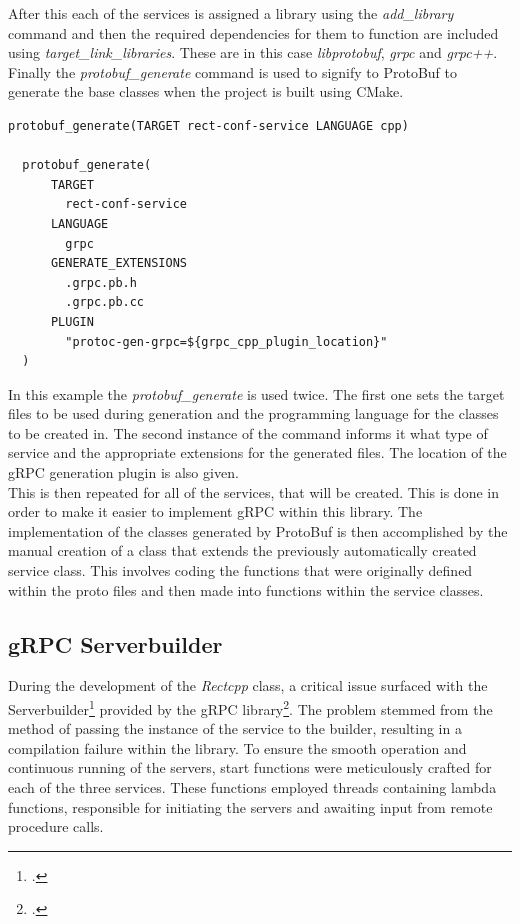 After this each of the services is assigned a library using the \textit{add\_library} command and then the required dependencies for them to function are included using
\textit{target\_link\_libraries}. These are in this case \textit{libprotobuf}, \textit{grpc} and \textit{grpc++}.\\

Finally the \textit{protobuf\_generate} command is used to signify to ProtoBuf to generate the base classes when the project is built using CMake. 

\begin{minipage}{\textwidth}
\begin{lstlisting}[caption=Excerpt from CMakeLists file of the C++ portion]
  protobuf_generate(TARGET rect-conf-service LANGUAGE cpp)

  protobuf_generate(
      TARGET
        rect-conf-service
      LANGUAGE
        grpc 
      GENERATE_EXTENSIONS
        .grpc.pb.h
        .grpc.pb.cc
      PLUGIN 
        "protoc-gen-grpc=${grpc_cpp_plugin_location}"
  )
\end{lstlisting}
\end{minipage}
In this example the \textit{protobuf\_generate} is used twice. The first one sets the target files to be used during generation and the programming language 
for the classes to be created in. The second instance of the command informs it what type of service and the appropriate extensions for the generated files. 
The location of the gRPC generation plugin is also given.\\

This is then repeated for all of the services, that will be created. This is done in order to make it easier to implement gRPC within this library. 
The implementation of the classes generated by ProtoBuf is then accomplished by the manual creation of a class that extends the previously automatically 
created service class. This involves coding the functions that were originally defined within the proto files and then made into functions within the service classes.

\subsection{gRPC Serverbuilder}
During the development of the \textit{Rectcpp} class, a critical issue surfaced with the Serverbuilder\footcite{grpc_git_serverbuilder} provided by the gRPC library\footcite{grpc_git_documentation}. The problem stemmed from the method of 
passing the instance of the service to the builder, resulting in a compilation failure within the library. To ensure the smooth operation and continuous running of 
the servers, start functions were meticulously crafted for each of the three services. These functions employed threads containing lambda functions, responsible for 
initiating the servers and awaiting input from remote procedure calls. \\

